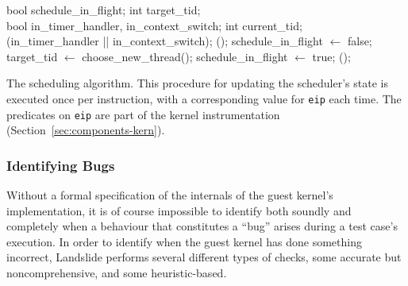 \begin{algorithm*}[t!]
	\label{alg:inflight}
	\begin{algorithmic}
		\State bool schedule\_in\_flight;
		\State int target\_tid;
		\\
		\State bool in\_timer\_handler, in\_context\_switch;
		\State int current\_tid;
		\\
				(in\_timer\_handler || in\_context\_switch);
						();
					\Else
						\State schedule\_in\_flight $\gets$ false;
					\EndIf
				\EndIf
				\State target\_tid $\gets$ {\sc choose\_new\_thread}();
				\State schedule\_in\_flight $\gets$ true;
				();
			\EndIf
		\EndFunction
	\end{algorithmic}
	\caption{The scheduling algorithm. This procedure for updating the scheduler's state is executed once per instruction, with a corresponding value for \texttt{eip} each time. The predicates on \texttt{eip} are part of the kernel instrumentation (Section~\ref{sec:components-kern}).}
\end{algorithm*}

\subsubsection{Identifying Bugs}

Without a formal specification of the internals of the guest kernel's implementation\cite{sel4}, it is of course impossible to identify both soundly and completely when a behaviour that constitutes a ``bug'' arises during a test case's execution.
In order to identify when the guest kernel has done something incorrect, Landslide performs several different types of checks, some accurate but noncomprehensive, and some heuristic-based.

